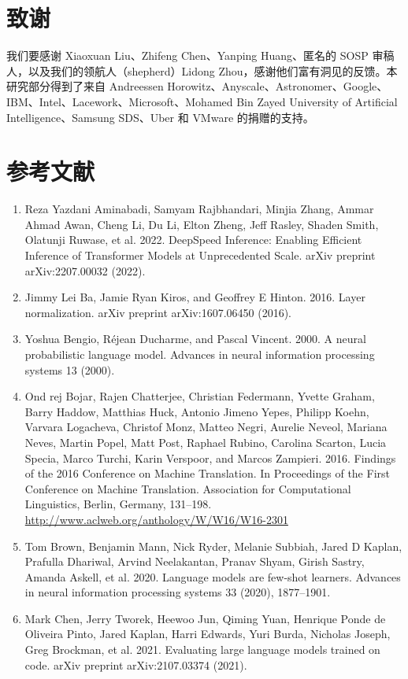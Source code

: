 \documentclass[11pt,UTF8,fontset=fandol]{ctexart}
\begin{document}
\section*{致谢}

我们要感谢 Xiaoxuan Liu、Zhifeng Chen、Yanping Huang、匿名的 SOSP 审稿人，以及我们的领航人（shepherd）Lidong Zhou，感谢他们富有洞见的反馈。本研究部分得到了来自 Andreessen Horowitz、Anyscale、Astronomer、Google、IBM、Intel、Lacework、Microsoft、Mohamed Bin Zayed University of Artificial Intelligence、Samsung SDS、Uber 和 VMware 的捐赠的支持。

\section*{参考文献}
\begin{enumerate}[leftmargin=2.2em,labelsep=0.6em,itemsep=0.25em]
\item Reza Yazdani Aminabadi, Samyam Rajbhandari, Minjia Zhang, Ammar Ahmad Awan, Cheng Li, Du Li, Elton Zheng, Jeff Rasley, Shaden Smith, Olatunji Ruwase, et al. 2022. DeepSpeed Inference: Enabling Efficient Inference of Transformer Models at Unprecedented Scale. arXiv preprint arXiv:2207.00032 (2022).
\item Jimmy Lei Ba, Jamie Ryan Kiros, and Geoffrey E Hinton. 2016. Layer normalization. arXiv preprint arXiv:1607.06450 (2016).
\item Yoshua Bengio, Réjean Ducharme, and Pascal Vincent. 2000. A neural probabilistic language model. Advances in neural information processing systems 13 (2000).
\item Ond rej Bojar, Rajen Chatterjee, Christian Federmann, Yvette Graham, Barry Haddow, Matthias Huck, Antonio Jimeno Yepes, Philipp Koehn, Varvara Logacheva, Christof Monz, Matteo Negri, Aurelie Neveol, Mariana Neves, Martin Popel, Matt Post, Raphael Rubino, Carolina Scarton, Lucia Specia, Marco Turchi, Karin Verspoor, and Marcos Zampieri. 2016. Findings of the 2016 Conference on Machine Translation. In Proceedings of the First Conference on Machine Translation. Association for Computational Linguistics, Berlin, Germany, 131--198. \url{http://www.aclweb.org/anthology/W/W16/W16-2301}
\item Tom Brown, Benjamin Mann, Nick Ryder, Melanie Subbiah, Jared D Kaplan, Prafulla Dhariwal, Arvind Neelakantan, Pranav Shyam, Girish Sastry, Amanda Askell, et al. 2020. Language models are few-shot learners. Advances in neural information processing systems 33 (2020), 1877--1901.
\item Mark Chen, Jerry Tworek, Heewoo Jun, Qiming Yuan, Henrique Ponde de Oliveira Pinto, Jared Kaplan, Harri Edwards, Yuri Burda, Nicholas Joseph, Greg Brockman, et al. 2021. Evaluating large language models trained on code. arXiv preprint arXiv:2107.03374 (2021).

\end{enumerate}
\end{document}
